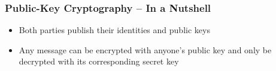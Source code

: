 \documentclass[
	aspectratio=169,
	xetex,
]{beamer}
\newcounter{i}
\begin{document}
\begin{frame}
	\frametitle{Public-Key Cryptography -- In a Nutshell}
	\vspace{3mm}
	\begin{minipage}[t][.65\textheight]{\textwidth}
		\begin{center}
		\end{center}
	\end{minipage}

	\begin{itemize}
		\item Both parties publish their identities and public keys
		\item Any message can be encrypted with anyone's public key and only be decrypted with its corresponding secret key
	\end{itemize}
\end{frame}
\end{document}
